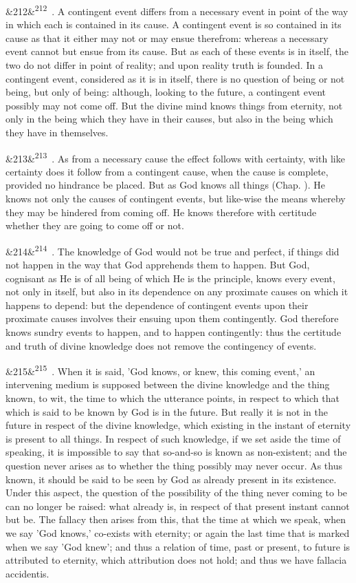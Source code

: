 \documentclass[12pt]{article}
\newcommand{\para}[1][]{\par\noindent\ifx&#1&\else\textsuperscript{\footnotesize #1}~\fi}
\begin{document}
\para[212] 2. A contingent event differs from a necessary event in point of the way in which each is contained in its cause. A contingent event is so contained in its cause as that it either may not or may ensue therefrom: whereas a necessary event cannot but ensue from its cause. But as each of these events is in itself, the two do not differ in point of reality; and upon reality truth is founded. In a contingent event, considered as it is in itself, there is no question of being or not being, but only of being: although, looking to the future, a contingent event possibly may not come off. But the divine mind knows things from eternity, not only in the being which they have in their causes, but also in the being which they have in themselves.

\para[213] 3. As from a necessary cause the effect follows with certainty, with like certainty does it follow from a contingent cause, when the cause is complete, provided no hindrance be placed. But as God knows all things (Chap. ). He knows not only the causes of contingent events, but like-wise the means whereby they may be hindered from coming off. He knows therefore with certitude whether they are going to come off or not.

\para[214] 6. The knowledge of God would not be true and perfect, if things did not happen in the way that God apprehends them to happen. But God, cognisant as He is of all being of which He is the principle, knows every event, not only in itself, but also in its dependence on any proximate causes on which it happens to depend: but the dependence of contingent events upon their proximate causes involves their ensuing upon them contingently. God therefore knows sundry events to happen, and to happen contingently: thus the certitude and truth of divine knowledge does not remove the contingency of events.

\para[215] 7. When it is said, 'God knows, or knew, this coming event,' an intervening medium is supposed between the divine knowledge and the thing known, to wit, the time to which the utterance points, in respect to which that which is said to be known by God is in the future. But really it is not in the future in respect of the divine knowledge, which existing in the instant of eternity is present to all things. In respect of such knowledge, if we set aside the time of speaking, it is impossible to say that so-and-so is known as non-existent; and the question never arises as to whether the thing possibly may never occur. As thus known, it should be said to be seen by God as already present in its existence. Under this aspect, the question of the possibility of the thing never coming to be can no longer be raised: what already is, in respect of that present instant cannot but be. The fallacy then arises from this, that the time at which we speak, when we say 'God knows,' co-exists with eternity; or again the last time that is marked when we say 'God knew'; and thus a relation of time, past or present, to future is attributed to eternity, which attribution does not hold; and thus we have fallacia accidentis.
\end{document}
